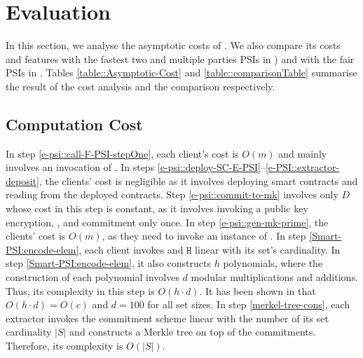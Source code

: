 


\vs



\section{Evaluation}\label{sec::valuation}



In this section, we analyse the asymptotic costs of \epsi. We also compare its costs and features with the fastest two and multiple parties PSIs in \cite{AbadiDMT22,DBLP:conf/ccs/KolesnikovMPRT17,NevoTY21,RaghuramanR22}) and with the fair PSIs in \cite{DebnathD16,DBLP:conf/dbsec/DongCCR13}. Tables \ref{table::Asymptotic-Cost} and \ref{table::comparisonTable} summarise the result of the cost analysis and the comparison respectively. 




\vs




\subsection{Computation Cost}



In step \ref{e-psi::call-F-PSI-stepOne}, each client's cost is $O(m)$ and mainly involves an invocation of \ct. 
% 
In steps \ref{e-psi::deploy-SC-E-PSI}--\ref{e-PSI::extractor-deposit}, the clients' cost is negligible as it involves deploying smart contracts and reading from the deployed contracts. 
%
Step \ref{e-psi::commit-to-mk} involves only $D$ whose cost in this step is constant, as it involves invoking a public key encryption, \prf,  and commitment only once. In step \ref{e-psi::gen-mk-prime}, the clients' cost is  $O(m)$, as they need to invoke an instance of \ct. 
%
In step \ref{Smart-PSI:encode-elem}, each client invokes \prp and $\mathtt{H}$ linear with its set's cardinality. In step \ref{Smart-PSI:encode-elem}, it also constructs $h$ polynomials, where the construction of each polynomial involves $d$  modular multiplications and additions. Thus, its complexity in this step is $O(h\cdot d)$. It has been shown in \cite{AbadiDMT22} that $O(h\cdot d)=O(c)$ and  $d=100$ for all set sizes. 
%
In step \ref{merkel-tree-cons}, each extractor invokes the commitment scheme linear with the number of its set cardinality $|S|$ and constructs a Merkle tree on top of the commitments. Therefore, its complexity is $O(|S|)$. 


